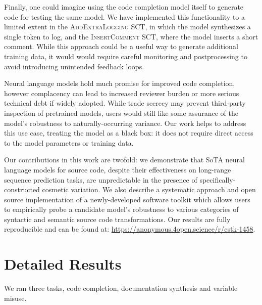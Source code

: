 \documentclass[usenames,dvipsnames]{article} %
\begin{document}
  Finally, one could imagine using the code completion model itself to generate code for testing the same model. We have implemented this functionality to a limited extent in the \textsc{AddExtraLogging} SCT, in which the model synthesizes a single token to log, and the \textsc{InsertComment} SCT, where the model inserts a short comment. While this approach could be a useful way to generate additional training data, it would would require careful monitoring and postprocessing to avoid introducing unintended feedback loops.

  Neural language models hold much promise for improved code completion, however complacency can lead to increased reviewer burden or more serious technical debt if widely adopted. While trade secrecy may prevent third-party inspection of pretrained models, users would still like some assurance of the model's robustness to naturally-occurring variance. Our work helps to address this use case, treating the model as a black box: it does not require direct access to the model parameters or training data.

  Our contributions in this work are twofold: we demonstrate that SoTA neural language models for source code, despite their effectiveness on long-range sequence prediction tasks, are unpredictable in the presence of specifically-constructed cosmetic variation. We also describe a systematic approach and open source implementation of a newly-developed software toolkit which allows users to empirically probe a candidate model's robustness to various categories of syntactic and semantic source code transformations. Our results are fully reproducible and can be found at: \url{https://anonymous.4open.science/r/cstk-1458}.

  \pagebreak
  
  \pagebreak
  \appendix
  \section{Detailed Results}\label{sec:detailed_results}
  We ran three tasks, code completion, documentation synthesis and variable misuse.
\end{document}
